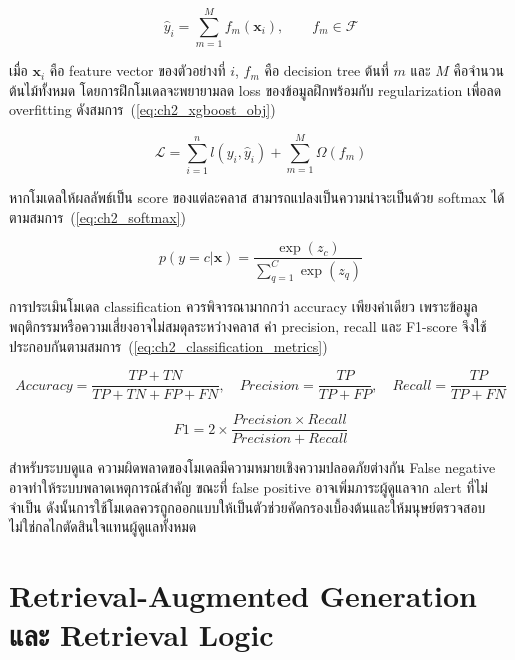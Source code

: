 \begin{equation}
    \hat{y}_i = \sum_{m=1}^{M} f_m(\mathbf{x}_i), \qquad f_m \in \mathcal{F}
    \label{eq:ch2_xgboost_model}
\end{equation}

เมื่อ $\mathbf{x}_i$ คือ feature vector ของตัวอย่างที่ $i$, $f_m$ คือ decision tree ต้นที่ $m$ และ $M$ คือจำนวนต้นไม้ทั้งหมด โดยการฝึกโมเดลจะพยายามลด loss ของข้อมูลฝึกพร้อมกับ regularization เพื่อลด overfitting ดังสมการ~(\ref{eq:ch2_xgboost_obj})

\begin{equation}
    \mathcal{L} = \sum_{i=1}^{n} l(y_i,\hat{y}_i) + \sum_{m=1}^{M}\Omega(f_m)
    \label{eq:ch2_xgboost_obj}
\end{equation}

หากโมเดลให้ผลลัพธ์เป็น score ของแต่ละคลาส สามารถแปลงเป็นความน่าจะเป็นด้วย softmax ได้ตามสมการ~(\ref{eq:ch2_softmax})

\begin{equation}
    p(y=c|\mathbf{x}) = \frac{\exp(z_c)}{\sum_{q=1}^{C}\exp(z_q)}
    \label{eq:ch2_softmax}
\end{equation}

การประเมินโมเดล classification ควรพิจารณามากกว่า accuracy เพียงค่าเดียว เพราะข้อมูลพฤติกรรมหรือความเสี่ยงอาจไม่สมดุลระหว่างคลาส ค่า precision, recall และ F1-score จึงใช้ประกอบกันตามสมการ~(\ref{eq:ch2_classification_metrics}) \cite{Sokolova2009ClassificationMetrics}

\begin{equation}
    Accuracy = \frac{TP+TN}{TP+TN+FP+FN}, \quad
    Precision = \frac{TP}{TP+FP}, \quad
    Recall = \frac{TP}{TP+FN}
    \label{eq:ch2_classification_metrics}
\end{equation}

\begin{equation}
    F1 = 2 \times \frac{Precision \times Recall}{Precision + Recall}
    \label{eq:ch2_f1}
\end{equation}

สำหรับระบบดูแล ความผิดพลาดของโมเดลมีความหมายเชิงความปลอดภัยต่างกัน False negative อาจทำให้ระบบพลาดเหตุการณ์สำคัญ ขณะที่ false positive อาจเพิ่มภาระผู้ดูแลจาก alert ที่ไม่จำเป็น ดังนั้นการใช้โมเดลควรถูกออกแบบให้เป็นตัวช่วยคัดกรองเบื้องต้นและให้มนุษย์ตรวจสอบ ไม่ใช่กลไกตัดสินใจแทนผู้ดูแลทั้งหมด

\section{Retrieval-Augmented Generation และ Retrieval Logic}
\label{sec:ch2_rag_retrieval_logic}

